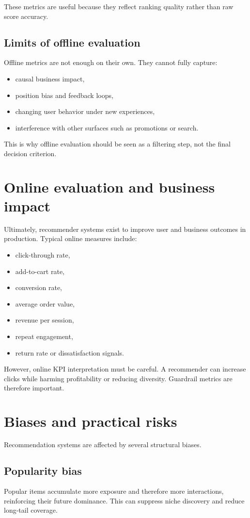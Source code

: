 These metrics are useful because they reflect ranking quality rather than raw score accuracy.

\subsection{Limits of offline evaluation}
Offline metrics are not enough on their own.
They cannot fully capture:
\begin{itemize}
  \item causal business impact,
  \item position bias and feedback loops,
  \item changing user behavior under new experiences,
  \item interference with other surfaces such as promotions or search.
\end{itemize}

This is why offline evaluation should be seen as a filtering step, not the final decision criterion.

\section{Online evaluation and business impact}
Ultimately, recommender systems exist to improve user and business outcomes in production.
Typical online measures include:
\begin{itemize}
  \item click-through rate,
  \item add-to-cart rate,
  \item conversion rate,
  \item average order value,
  \item revenue per session,
  \item repeat engagement,
  \item return rate or dissatisfaction signals.
\end{itemize}

However, online KPI interpretation must be careful.
A recommender can increase clicks while harming profitability or reducing diversity.
Guardrail metrics are therefore important.

\section{Biases and practical risks}
Recommendation systems are affected by several structural biases.

\subsection{Popularity bias}
Popular items accumulate more exposure and therefore more interactions, reinforcing their future dominance.
This can suppress niche discovery and reduce long-tail coverage.

